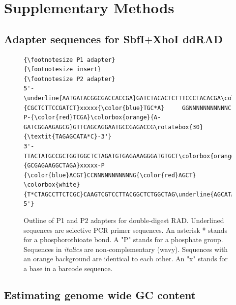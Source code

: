 \documentclass[a4paper,12pt,times,print,index, custombib]{PhDThesisPSnPDF}\usepackage[]{graphicx}\usepackage[]{color}
\begin{document}
\section{Supplementary Methods}

\subsection{Adapter sequences for SbfI$+$XhoI ddRAD}\label{ch:adapter_sequences}

\begin{figure}[h]
\begin{Verbatim}[fontfamily=courier, fontsize=\relsize{-7}, commandchars=\\\{\}, frame=single, framesep=10pt, label=P1 and P2 adapters for ddRAD]
          {\footnotesize P1 adapter}                                        {\footnotesize insert}                                   {\footnotesize P2 adapter}
5'-\underline{AATGATACGGCGACCACCGA}GATCTACACTCTTTCCCTACACGA\colorbox{white}{CGCTCTTCCGATCT}xxxxx{\color{blue}TGC*A}     GGNNNNNNNNNNNC     P-{\color{red}TCGA}\colorbox{orange}{A-GATCGGAAGAGCG}GTTCAGCAGGAATGCCGAGACCG\rotatebox{30}{\textit{TAGAGCATA*C}-3'}
3'-TTACTATGCCGCTGGTGGCTCTAGATGTGAGAAAGGGATGTGCT\colorbox{orange}{GCGAGAAGGCTAGA}xxxxx-P    {\color{blue}ACGT}CCNNNNNNNNNNNG{\color{red}AGCT}       \colorbox{white}{T*CTAGCCTTCTCGC}CAAGTCGTCCTTACGGCTCTGGCTAG\underline{AGCATACGGCAGAAGACGAAC-5'}
\end{Verbatim}
\caption{Outline of P1 and P2 adapters for double-digest RAD. Underlined sequences are selective PCR primer sequences. An asterisk * stands for a phosphorothioate bond. A "P" stands for a phosphate group. Sequences in \textit{italics} are non-complementary (wavy). Sequences with an orange background are identical to each other. An "x" stands for a base in a barcode sequence.}
\label{adapter_outline} %
\end{figure}


\FloatBarrier
\subsection{Estimating genome wide GC content}\label{ch:gc}
\end{document}
